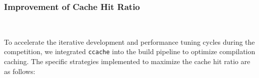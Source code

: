 \subsubsection{Improvement of Cache Hit Ratio}
\ 





To accelerate the iterative development and performance tuning cycles during the competition, we integrated \texttt{ccache} into the build pipeline to optimize compilation caching. 
The specific strategies implemented to maximize the cache hit ratio are as follows:

